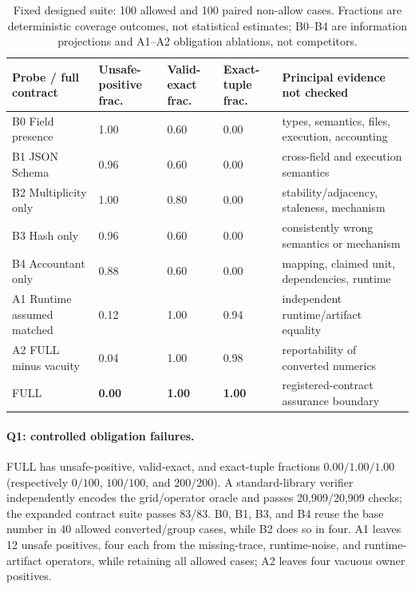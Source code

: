 \documentclass[letterpaper]{article} %
\newcommand{\AuditContractTestCount}{83}
\begin{document}
\begin{table}[t]
\centering
{\small
\begin{tabular}{@{}p{}p{}p{}p{}p{}@{}}
\hline
Probe / full contract & Unsafe-positive frac. & Valid-exact frac. & Exact-tuple frac. & Principal evidence not checked \\
\hline
B0 Field presence & 1.00 & 0.60 & 0.00 & types, semantics, files, execution, accounting \\
B1 JSON Schema & 0.96 & 0.60 & 0.00 & cross-field and execution semantics \\
B2 Multiplicity only & 1.00 & 0.80 & 0.00 & stability/adjacency, staleness, mechanism \\
B3 Hash only & 0.96 & 0.60 & 0.00 & consistently wrong semantics or mechanism \\
B4 Accountant only & 0.88 & 0.60 & 0.00 & mapping, claimed unit, dependencies, runtime \\
A1 Runtime assumed matched & 0.12 & 1.00 & 0.94 & independent runtime/artifact equality \\
A2 FULL minus vacuity & 0.04 & 1.00 & 0.98 & reportability of converted numerics \\
FULL & \textbf{0.00} & \textbf{1.00} & \textbf{1.00} & registered-contract assurance boundary \\
\hline
\end{tabular}
}
\caption{Fixed designed suite: 100 allowed and 100 paired non-allow cases. Fractions are deterministic coverage outcomes, not statistical estimates; B0--B4 are information projections and A1--A2 obligation ablations, not competitors.}
\label{tab:obligation-probes}
\end{table}

\paragraph{Q1: controlled obligation failures.}
FULL has unsafe-positive, valid-exact, and exact-tuple fractions $0.00/1.00/1.00$ (respectively $0/100$, $100/100$, and $200/200$). A standard-library verifier independently encodes the grid/operator oracle and passes 20,909/20,909 checks; the expanded contract suite passes \AuditContractTestCount/\AuditContractTestCount. B0, B1, B3, and B4 reuse the base number in 40 allowed converted/group cases, while B2 does so in four. A1 leaves 12 unsafe positives, four each from the missing-trace, runtime-noise, and runtime-artifact operators, while retaining all allowed cases; A2 leaves four vacuous owner positives.
\end{document}
